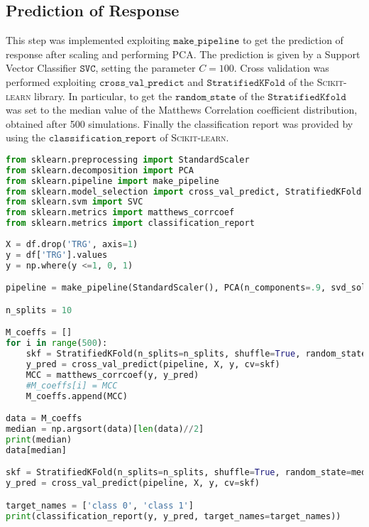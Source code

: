\documentclass{standalone}
\begin{document}
\subsection{Prediction of Response}

This step was implemented exploiting $\mathtt{make\_pipeline}$ to get the prediction of response after scaling and performing PCA.
The prediction is given by a Support Vector Classifier $\mathtt{SVC}$, setting the parameter $C = 100$.
Cross validation was performed exploiting $\mathtt{cross\_val\_predict}$ and $\mathtt{StratifiedKFold}$ of the \textsc{Scikit-learn} library\cite{scikit}.
In particular, to get the $\mathtt{random\_state}$ of the $\mathtt{StratifiedKfold}$ was set to the median value of the Matthews Correlation coefficient distribution, obtained after 500 simulations.
Finally the classification report was provided by using the $\mathtt{classification\_report}$ of \textsc{Scikit-learn}.


\begin{lstlisting}[language = python, caption=Prediction of response implementation]
from sklearn.preprocessing import StandardScaler
from sklearn.decomposition import PCA
from sklearn.pipeline import make_pipeline
from sklearn.model_selection import cross_val_predict, StratifiedKFold
from sklearn.svm import SVC
from sklearn.metrics import matthews_corrcoef
from sklearn.metrics import classification_report
    
X = df.drop('TRG', axis=1)
y = df['TRG'].values
y = np.where(y <=1, 0, 1)

pipeline = make_pipeline(StandardScaler(), PCA(n_components=.9, svd_solver='full'), SVC(C=100, probability=True, random_state=0))

n_splits = 10

M_coeffs = []
for i in range(500):
    skf = StratifiedKFold(n_splits=n_splits, shuffle=True, random_state=i + 1)
    y_pred = cross_val_predict(pipeline, X, y, cv=skf)
    MCC = matthews_corrcoef(y, y_pred)
    #M_coeffs[i] = MCC
    M_coeffs.append(MCC)

data = M_coeffs
median = np.argsort(data)[len(data)//2]
print(median)
data[median]

skf = StratifiedKFold(n_splits=n_splits, shuffle=True, random_state=median + 1)
y_pred = cross_val_predict(pipeline, X, y, cv=skf)

target_names = ['class 0', 'class 1']
print(classification_report(y, y_pred, target_names=target_names))



\end{lstlisting}
    
\end{document}
